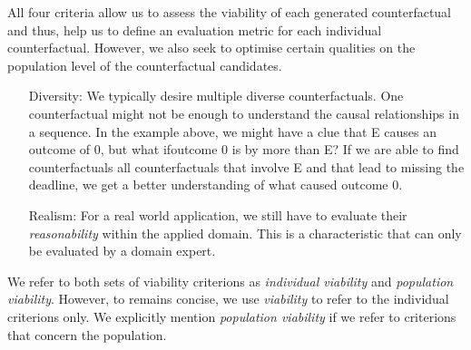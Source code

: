 \documentclass[./../../paper.tex]{subfiles}
\begin{document}
\noindent All four criteria allow us to assess the viability of each generated counterfactual and thus, help us to define an evaluation metric for each individual counterfactual. However, we also seek to optimise certain qualities on the population level of the counterfactual candidates.  

\begin{itemize}
    \item[Diversity:] We typically desire multiple diverse counterfactuals. One counterfactual might not be enough to understand the causal relationships in a sequence. In the example above, we might have a clue that E causes an outcome of 0, but what ifoutcome 0 is by more than E? If we are able to find counterfactuals all counterfactuals that involve E and that lead to missing the deadline, we get a better understanding of what caused outcome 0.
    \item[Realism:] For a real world application, we still have to evaluate their \emph{reasonability} within the applied domain. This is a characteristic that can only be evaluated by a domain expert. 
\end{itemize}

We refer to both sets of viability criterions as \emph{individual viability} and \emph{population viability}. However, to remains concise, we use \emph{viability} to refer to the individual criterions only. We explicitly mention \emph{population viability} if we refer to criterions that concern the population.
\end{document}
